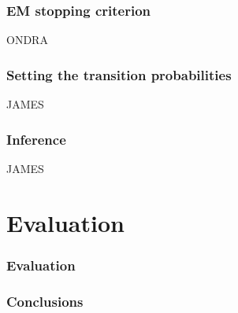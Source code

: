\documentclass{beamer}
\begin{document}
\begin{frame}
  \frametitle{EM stopping criterion}
  ONDRA
\end{frame}


\begin{frame}
  \frametitle{Setting the transition probabilities}
  JAMES
\end{frame}


\begin{frame}
  \frametitle{Inference}
  JAMES
\end{frame}

\section{Evaluation}
\begin{frame}
  \frametitle{Evaluation}
  
\end{frame}

\begin{frame}
  \frametitle{Conclusions}
\end{frame}
\end{document}
